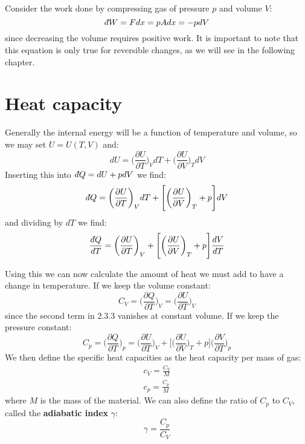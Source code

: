 \documentclass[a4paper,11pt,oneside]{book}
\newcommand{\dbar}{d\hspace*{-0.08em}\bar{}\hspace*{0.1em}}
\begin{document}
Consider the work done by compressing gas of pressure $p$ and volume $V$:
\begin{equation}
    \dbar W = F dx = p A dx =- p dV 
\end{equation}
since decreasing the volume requires positive work. It is important to note that this equation is only true for reversible changes, as we will see in the following chapter. 
\section{Heat capacity}
Generally the internal energy will be a function of temperature and volume, so we may set $U=U(T,V)$ and:
\begin{equation}
    dU = \bigg(\frac{\partial U}{\partial T}\bigg)_V dT+\bigg(\frac{\partial U}{\partial V}\bigg)_T dV
\end{equation}
Inserting this into $\dbar Q = dU + pdV$ we find:
\begin{equation}
    \dbar Q = \bigg(\frac{\partial U}{\partial T}\bigg)_V dT+\Bigg[\bigg(\frac{\partial U}{\partial V}\bigg)_T+p\Bigg] dV
\end{equation}
and dividing by $dT$ we find:
\begin{equation}
    \frac{\dbar Q}{dT} = \bigg(\frac{\partial U}{\partial T}\bigg)_V +\Bigg[\bigg(\frac{\partial U}{\partial V}\bigg)_T+p\Bigg] \frac{dV}{dT}
\end{equation}

Using this we can now calculate the amount of heat we must add to have a change in temperature.
If we keep the volume constant:
\begin{equation}
    C_V = \Big(\frac{\partial Q}{\partial T}\Big)_V=\bigg(\frac{\partial U}{\partial T}\bigg)_V
\end{equation}
since the second term in 2.3.3 vanishes at constant volume. 
If we keep the pressure constant:
\begin{equation}
    C_p = \Big(\frac{\partial Q}{\partial T}\Big)_p= \bigg(\frac{\partial U}{\partial T}\bigg)_V +\Bigg[\bigg(\frac{\partial U}{\partial V}\bigg)_T+p\Bigg] \bigg(\frac{\partial V}{\partial T}\bigg)_p
\end{equation}
We then define the specific heat capacities as the heat capacity per mass of gas:
\begin{align}
    c_V = \frac{C_V}{M}\\
    c_p = \frac{C_p}{M}
\end{align}
where $M$ is the mass of the material. 
We can also define the ratio of $C_p$ to $C_V$, called the \textbf{adiabatic index} $\gamma$:
\begin{equation}
    \gamma = \frac{C_p}{C_V}
\end{equation}
\end{document}
